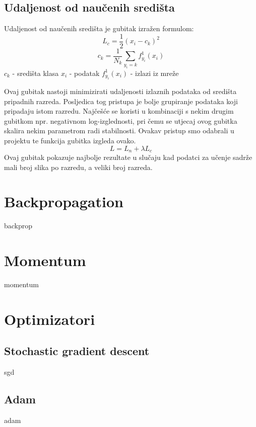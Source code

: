 \subsection{Udaljenost od naučenih središta}
	Udaljenost od naučenih središta je gubitak izražen formulom:
	\[
		L_c = \frac{1}{2} (x_i-c_k)^2
	\]
	\[
		c_k = \frac{1}{N_k}\sum_{y_i=k}f_{y_i}^1(x_i)
	\]
	$c_k$ - središta klasa
	\newline
	$x_i$ - podatak
	\newline
	$f_{y_i}^1(x_i)$ - izlazi iz mreže
	\newline
	
Ovaj gubitak nastoji minimizirati udaljenosti izlaznih podataka od središta pripadnih razreda. Posljedica tog pristupa je bolje grupiranje podataka koji pripadaju istom razredu. Najčešće se koristi u kombinaciji s nekim drugim gubitkom npr. negativnom log-izglednosti, pri čemu se utjecaj ovog gubitka skalira nekim parametrom radi stabilnosti. Ovakav pristup smo odabrali u projektu te funkcija gubitka izgleda ovako.
\[
	L = L_n + \lambda L_c
\]
 Ovaj gubitak pokazuje najbolje rezultate u slučaju kad podatci za učenje sadrže mali broj slika po razredu, a veliki broj razreda.
	 


\section{Backpropagation}

backprop

\section{Momentum}

momentum

\section{Optimizatori}

\subsection{Stochastic gradient descent}

sgd

\subsection{Adam}

adam